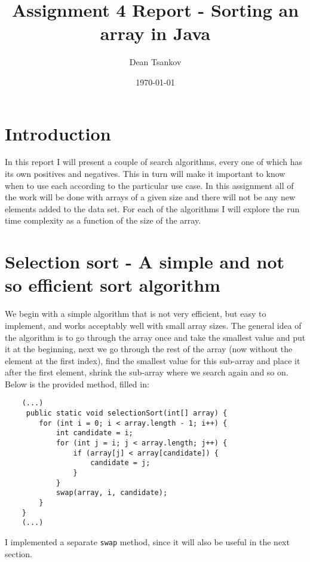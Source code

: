 \documentclass[a4paper,11pt]{article}
\begin{document}
\title{
    \textbf{Assignment 4 Report - Sorting an array in Java}
}
\author{Dean Tsankov}
\date{\today}

\maketitle

\section*{Introduction}
In this report I will present a couple of search algorithms, every one of which has its own positives and negatives. This in turn will make it important to know when to use each according to the particular use case. In this assignment all of the work will be done with arrays of a given size and there will not be any new elements added to the data set. For each of the algorithms I will explore the run time complexity as a function of the size of the array.

\section*{Selection sort - A simple and not so efficient sort algorithm}

We begin with a simple algorithm that is not very efficient, but easy to implement, and works acceptably well with small array sizes. The general idea of the algorithm is to go through the array once and take the smallest value and put it at the beginning, next we go through the rest of the array (now without the element at the first index), find the smallest value for this sub-array and place it after the first element, shrink the sub-array where we search again and so on. Below is the provided method, filled in: 

\begin{verbatim}
    (...)
     public static void selectionSort(int[] array) {
        for (int i = 0; i < array.length - 1; i++) {
            int candidate = i;
            for (int j = i; j < array.length; j++) {
                if (array[j] < array[candidate]) {
                    candidate = j;
                }
            }
            swap(array, i, candidate);
        }
    }
    (...)
\end{verbatim}   

I implemented a separate {\tt swap} method, since it will also be useful in the next section.
\end{document}
